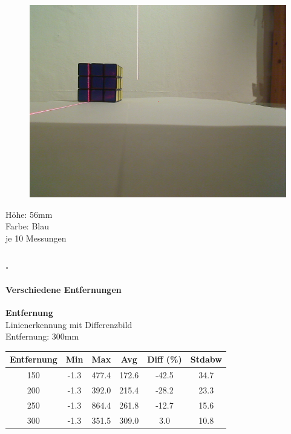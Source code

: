 \documentclass[xcolor=dvipsnames]{beamer}
\def\frametitlesec{\frametitle{\arabic{section}.\hspace{0.5ex}\insertsection}}
\def\framesubtitles#1{\framesubtitle{\hspace{3.5ex}#1}}
\begin{document}
\begin{frame}
\begin{figure}
\begin{minipage}{0.32\linewidth}
		\end{minipage}
		\hfill
		\begin{minipage}{0.32\linewidth}
			\includegraphics[width=\linewidth]{includes/test_dist_3}
		\end{minipage}
	\end{figure}
	Höhe: 56mm\\
	Farbe: Blau\\
	je 10 Messungen
	
\end{frame}

\begin{frame}
	\frametitlesec
	\framesubtitles{Verschiedene Entfernungen}
		\textbf{Entfernung}\\
		
		Linienerkennung mit Differenzbild\\
		Entfernung: 300mm
		
		\begin{tabular}{c|c|c|c|c|c}
			Entfernung & Min & Max & Avg & Diff (\%) & Stdabw\\ \hline
150 &      -1.3 & 477.4 & 172.6 & -42.5 & 34.7\\
200 &      -1.3 & 392.0 & 215.4 & -28.2 & 23.3\\
250 &      -1.3 & 864.4 & 261.8 & -12.7 & 15.6\\
300 &      -1.3 & 351.5 & 309.0 & 3.0 & 10.8\\

		\end{tabular}
		
		
\end{frame}
\end{document}
